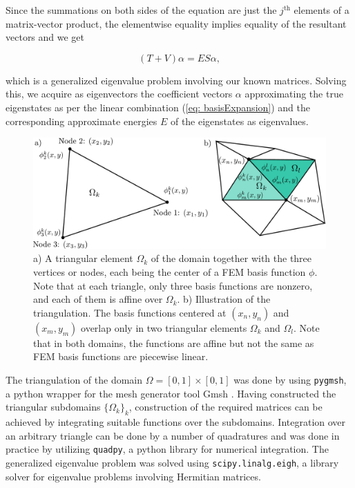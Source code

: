 \documentclass[a4paper,12pt]{article}
\begin{document}
Since the summations on both sides of the equation are just the $j^{\text{th}}$ elements of a matrix-vector product, the elementwise equality implies equality of the resultant vectors and we get

\begin{equation}
\label{eq: matrixFormFEMeq}
(T + V)\alpha = ES\alpha,
\end{equation}

which is a generalized eigenvalue problem involving our known matrices. Solving this, we acquire as eigenvectors the coefficient vectors $\alpha$ approximating the true eigenstates as per the linear combination (\ref{eq: basisExpansion}) and the corresponding approximate energies $E$ of the eigenstates as eigenvalues.





\begin{figure}[H]
\centering
\includegraphics[width=\textwidth]{../figs/triangle.pdf}
\caption{a) A triangular element $\Omega_k$ of the domain together with the three vertices or nodes, each being the center of a FEM basis function $\phi$. Note that at each triangle, only three basis functions are nonzero, and each of them is affine over $\Omega_k$. b) Illustration of the triangulation. The basis functions centered at $(x_n, y_n)$ and $(x_m, y_m)$ overlap only in two triangular elements $\Omega_k$ and $\Omega_l$. Note that in both domains, the functions are affine but not the same as FEM basis functions are piecewise linear.}
\label{fig: triangles}
\end{figure}

The triangulation of the domain $\Omega = [0,1]\times[0,1]$ was done by using \texttt{pygmsh}, a python wrapper for the mesh generator tool Gmsh \cite{PYGMSHdoc}. Having constructed the triangular subdomains $\lbrace \Omega_k \rbrace_k$, construction of the required matrices can be achieved by integrating suitable functions over the subdomains. Integration over an arbitrary triangle can be done by a number of quadratures and was done in practice by utilizing \texttt{quadpy}, a python library for numerical integration. The generalized eigenvalue problem was solved using \texttt{scipy.linalg.eigh}, a library solver for eigenvalue problems involving Hermitian matrices.
\end{document}
